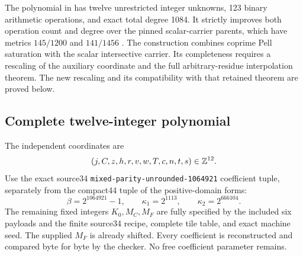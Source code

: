 \label{sec:integer12-saturated}

The polynomial in  has twelve
unrestricted integer unknowns,
123 binary arithmetic operations, and exact total degree 1084.  It
strictly improves both operation count and degree over the pinned
scalar-carrier parents, which have metrics $145/1200$ and $141/1456$
\cite{scalar12}.
The construction combines coprime Pell saturation with the scalar
intersective carrier.  Its completeness requires a rescaling of the
auxiliary coordinate and the full arbitrary-residue interpolation theorem.
The new rescaling and its compatibility with that retained theorem
are proved below.

\subsection{Complete twelve-integer polynomial}

The independent coordinates are
\[
 (j,C,z,h,r,v,w,T,c,n,t,s)\in\mathbb Z^{12}.
\]
Use the exact source34 \texttt{mixed-parity-unrounded-1064921} coefficient
tuple, separately from the compact44 tuple of the positive-domain forms:
\[
 \beta=2^{1064921}-1,\qquad
 \kappa_1=2^{1113},\qquad \kappa_2=2^{666104}.
\]
The remaining fixed integers $K_0,M_C,M_F$ are fully specified by the
included six payloads and the finite source34 recipe, complete tile table,
and exact machine seed.  The supplied $M_F$ is already shifted.  Every
coefficient is reconstructed and compared byte for byte by the checker.
No free coefficient parameter remains.

